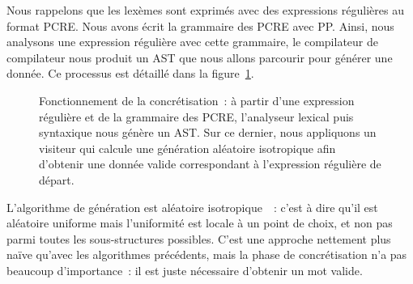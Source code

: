 Nous rappelons que les lexèmes sont exprimés avec des expressions régulières au
format PCRE. Nous avons écrit la grammaire des PCRE avec PP. Ainsi, nous
analysons une expression régulière avec cette grammaire, le compilateur de
compilateur nous produit un AST que nous allons parcourir pour générer une
donnée. Ce processus est détaillé dans la figure~\ref{figure:data:regex}.
%
\begin{figure}


\caption{\label{figure:data:regex} Fonctionnement de la concrétisation~: à
partir d'une expression régulière et de la grammaire des PCRE, l'analyseur
lexical puis syntaxique nous génère un AST. Sur ce dernier, nous appliquons un
visiteur qui calcule une génération aléatoire isotropique afin d'obtenir une
donnée valide correspondant à l'expression régulière de départ.}

\end{figure}
%
L'algorithme de génération est aléatoire isotropique~~: c'est à
dire qu'il est aléatoire uniforme mais l'uniformité est locale à un point de
choix, et non pas parmi toutes les sous-structures possibles. C'est une approche
nettement plus naïve qu'avec les algorithmes précédents, mais la phase de
concrétisation n'a pas beaucoup d'importance~: il est juste nécessaire d'obtenir
un mot valide.

